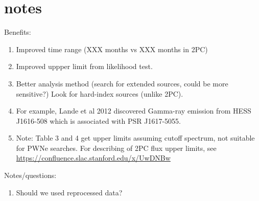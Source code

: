\section{notes}

Benefits:
\begin{enumerate}
\item Improved time range (XXX months vs XXX months in 2PC)
\item Improved uppper limit from likelihood test.
\item Better analysis method (search for extended sources, could be more sensitive?)
    Look for hard-index sources (unlike 2PC).
\item For example, Lande et al 2012 discovered Gamma-ray emission
    from HESS J1616-508 which is associated with PSR J1617-5055.
\item  Note: Table 3 and 4 get upper limits assuming cutoff spectrum, not suitable
for PWNe searches. For describing of 2PC flux upper limits, see 
\url{https://confluence.slac.stanford.edu/x/UwDNBw}
\end{enumerate}

Notes/questions:
\begin{enumerate}
  \item Should we used reprocessed data?
\end{enumerate}
